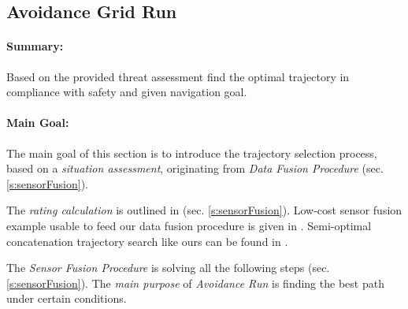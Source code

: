 \subsection{Avoidance Grid Run}\label{s:aviudabceGridRun}

\paragraph{Summary:} Based on the provided threat assessment find the optimal trajectory in compliance with safety and given navigation goal.

\paragraph{Main Goal:} The main goal of this section is to introduce the trajectory selection process, based on a \emph{situation assessment}, originating from \emph{Data Fusion Procedure} (sec. \ref{s:sensorFusion}). 

\begin{note}
    The \emph{rating calculation} is outlined in (sec. \ref{s:sensorFusion}). Low-cost sensor fusion example usable to feed our data fusion procedure is given in \cite{sabatini2013low}. Semi-optimal concatenation trajectory search  like ours can be found in \cite{shaw1998using}.
\end{note}

\begin{note}
    The \emph{Sensor Fusion Procedure} is solving all the following steps (sec. \ref{s:sensorFusion}). The \emph{main purpose} of \emph{Avoidance Run} is finding the best path under certain conditions.
\end{note}

